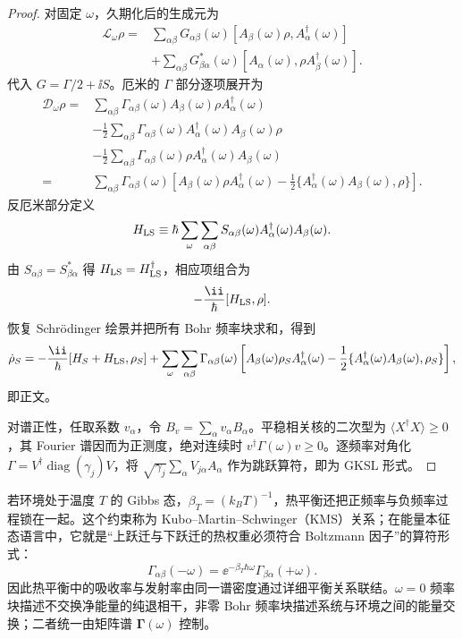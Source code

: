 \begin{proof}
对固定 $\omega$，久期化后的生成元为
\begin{align*}
\mathcal L_\omega\rho
={}&\sum_{\alpha\beta}
G_{\alpha\beta}(\omega)
[A_\beta(\omega)\rho,A_\alpha^\dagger(\omega)]\\
&+\sum_{\alpha\beta}
G_{\beta\alpha}^*(\omega)
[A_\alpha(\omega),\rho A_\beta^\dagger(\omega)].
\end{align*}
代入 $G=\Gamma/2+\ii S$。厄米的 $\Gamma$ 部分逐项展开为
\begin{align*}
\mathcal D_\omega\rho
={}&\sum_{\alpha\beta}\Gamma_{\alpha\beta}(\omega)
A_\beta(\omega)\rho A_\alpha^\dagger(\omega)\\
&-\frac12\sum_{\alpha\beta}\Gamma_{\alpha\beta}(\omega)
A_\alpha^\dagger(\omega)A_\beta(\omega)\rho\\
&-\frac12\sum_{\alpha\beta}\Gamma_{\alpha\beta}(\omega)
\rho A_\alpha^\dagger(\omega)A_\beta(\omega)\\
={}&\sum_{\alpha\beta}\Gamma_{\alpha\beta}(\omega)
\left[
A_\beta(\omega)\rho A_\alpha^\dagger(\omega)
-\frac12\{A_\alpha^\dagger(\omega)A_\beta(\omega),\rho\}
\right].
\end{align*}
反厄米部分定义
\[
H_{\rm LS}
\equiv\hbar\sum_\omega\sum_{\alpha\beta}
S_{\alpha\beta}(\omega)
A_\alpha^\dagger(\omega)A_\beta(\omega).
\]
由 $S_{\alpha\beta}=S_{\beta\alpha}^*$ 得
$H_{\rm LS}=H_{\rm LS}^\dagger$，相应项组合为
\[
-\frac{\ii}{\hbar}[H_{\rm LS},\rho].
\]
恢复 Schr\"odinger 绘景并把所有 Bohr 频率块求和，得到
\[
\dot\rho_S
=-\frac{\ii}{\hbar}[H_S+H_{\rm LS},\rho_S]
+\sum_\omega\sum_{\alpha\beta}\Gamma_{\alpha\beta}(\omega)
\left[
A_\beta(\omega)\rho_SA_\alpha^\dagger(\omega)
-\frac12\{A_\alpha^\dagger(\omega)A_\beta(\omega),\rho_S\}
\right],
\]
即正文。

对谱正性，任取系数 $v_\alpha$，令 $B_v=\sum_\alpha v_\alpha B_\alpha$。平稳相关核的二次型为 $\langle X^\dagger X\rangle\ge0$，其 Fourier 谱因而为正测度，绝对连续时 $v^\dagger\Gamma(\omega)v\ge0$。逐频率对角化 $\Gamma=V^\dagger\operatorname{diag}(\gamma_j)V$，将 $\sqrt{\gamma_j}\sum_\alpha V_{j\alpha}A_\alpha$ 作为跳跃算符，即为 GKSL 形式。
\end{proof}


若环境处于温度 $T$ 的 Gibbs 态，$\beta_T=(k_BT)^{-1}$，热平衡还把正频率与负频率过程锁在一起。这个约束称为 Kubo--Martin--Schwinger（KMS）关系；在能量本征态语言中，它就是“上跃迁与下跃迁的热权重必须符合 Boltzmann 因子”的算符形式：
\begin{equation}
\boxed{
\Gamma_{\alpha\beta}(-\omega)
=\ee^{-\beta_T\hbar\omega}\Gamma_{\beta\alpha}(+\omega).}
\label{eq:kms_detailed_balance_electron}
\end{equation}
因此热平衡中的吸收率与发射率由同一谱密度通过详细平衡关系联结。$\omega=0$ 频率块描述不交换净能量的纯退相干，非零 Bohr 频率块描述系统与环境之间的能量交换；二者统一由矩阵谱 $\boldsymbol\Gamma(\omega)$ 控制。

